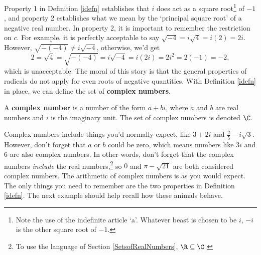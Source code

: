 Property 1 in Definition \ref{idefn} establishes that $i$ does act as a square root\footnote{Note the use of the indefinite article `a'.  Whatever beast is chosen to be $i$, $-i$ is the other square root of $-1$.} of $-1$, and property 2 establishes what we mean by the `principal square root' of a negative real number.  In property 2, it is important to remember the restriction on $c$.  For example, it is perfectly acceptable to say  $\sqrt{-4} = i \sqrt{4} = i(2) = 2i$. However, $\sqrt{-(-4)} \neq i \sqrt{-4}$, otherwise, we'd get\[ 2 = \sqrt{4} = \sqrt{-(-4)} = i \sqrt{-4} = i (2i) = 2i^2 = 2(-1) = -2,\] which is unacceptable. The moral of this story is that the general properties of radicals do not apply for even roots of negative quantities.  With Definition \ref{idefn} in place, we can define the set of \textbf{complex numbers}.

\begin{tcolorbox}

\begin{defn} \label{complexdefn} A \textbf{complex number} is a number of the form $a+bi$, where $a$ and $b$ are real numbers and $i$ is the imaginary unit.  The set of complex numbers is denoted $\C$.
\end{defn}

\end{tcolorbox}

Complex numbers include things you'd normally expect, like $3+2i$ and $\frac{2}{5} - i\sqrt{3}$.  However, don't forget that $a$ or $b$ could be zero, which means numbers like $3i$ and $6$ are also complex numbers.  In other words, don't forget that the complex numbers \textit{include} the real numbers,\footnote{To use the language  of Section \ref{SetsofRealNumbers}, $\R \subseteq \C$.} so $0$ and $\pi - \sqrt{21}$ are both considered complex numbers.   The arithmetic of complex numbers is as you would expect.  The only things you need to remember are the two properties in Definition \ref{idefn}.  The next example should help recall how these animals behave.

